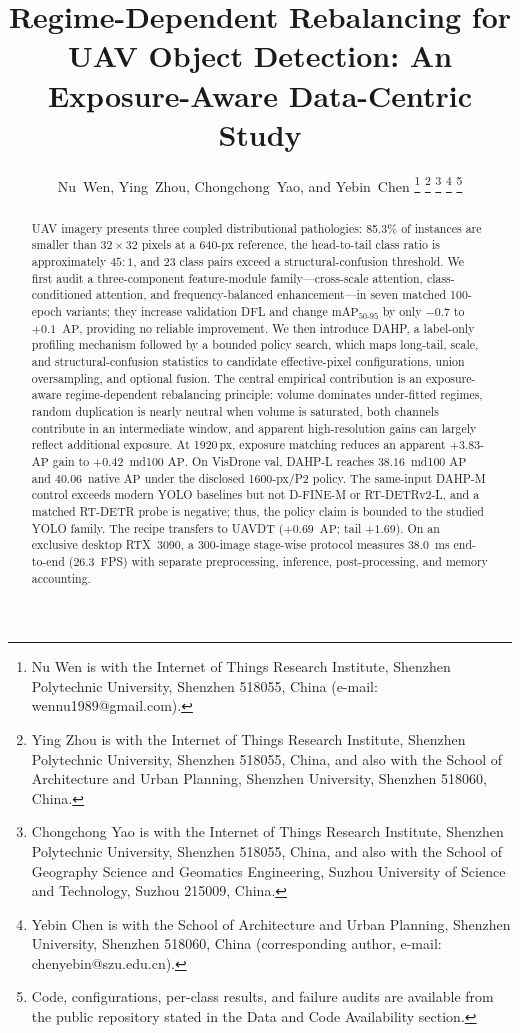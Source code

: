 \documentclass[journal]{IEEEtran}
\newcommand{\map}{\ensuremath{\mathrm{mAP}}}
\newcommand{\ap}{\ensuremath{\mathrm{AP}}}
\begin{document}
\title{Regime-Dependent Rebalancing for UAV Object Detection: An Exposure-Aware Data-Centric Study}

\author{Nu~Wen, Ying~Zhou, Chongchong~Yao, and Yebin~Chen%
\thanks{Nu Wen is with the Internet of Things Research Institute, Shenzhen Polytechnic University, Shenzhen 518055, China (e-mail: wennu1989@gmail.com).}%
\thanks{Ying Zhou is with the Internet of Things Research Institute, Shenzhen Polytechnic University, Shenzhen 518055, China, and also with the School of Architecture and Urban Planning, Shenzhen University, Shenzhen 518060, China.}%
\thanks{Chongchong Yao is with the Internet of Things Research Institute, Shenzhen Polytechnic University, Shenzhen 518055, China, and also with the School of Geography Science and Geomatics Engineering, Suzhou University of Science and Technology, Suzhou 215009, China.}%
\thanks{Yebin Chen is with the School of Architecture and Urban Planning, Shenzhen University, Shenzhen 518060, China (corresponding author, e-mail: chenyebin@szu.edu.cn).}%
\thanks{Code, configurations, per-class results, and failure audits are available from the public repository stated in the Data and Code Availability section.}}

\maketitle

\begin{abstract}
UAV imagery presents three coupled distributional pathologies: 85.3\% of instances are smaller than $32{\times}32$ pixels at a 640-px reference, the head-to-tail class ratio is approximately $45{:}1$, and 23 class pairs exceed a structural-confusion threshold. We first audit a three-component feature-module family---cross-scale attention, class-conditioned attention, and frequency-balanced enhancement---in seven matched 100-epoch variants; they increase validation DFL and change $\map_{50\text{-}95}$ by only $-0.7$ to $+0.1$~\ap, providing no reliable improvement. We then introduce DAHP, a label-only profiling mechanism followed by a bounded policy search, which maps long-tail, scale, and structural-confusion statistics to candidate effective-pixel configurations, union oversampling, and optional fusion. The central empirical contribution is an exposure-aware regime-dependent rebalancing principle: volume dominates under-fitted regimes, random duplication is nearly neutral when volume is saturated, both channels contribute in an intermediate window, and apparent high-resolution gains can largely reflect additional exposure. At 1920\,px, exposure matching reduces an apparent $+3.83$-\ap{} gain to $+0.42$~md100 \ap. On VisDrone val, DAHP-L reaches $38.16$~md100 \ap{} and $40.06$~native \ap{} under the disclosed 1600-px/P2 policy. The same-input DAHP-M control exceeds modern YOLO baselines but not D-FINE-M or RT-DETRv2-L, and a matched RT-DETR probe is negative; thus, the policy claim is bounded to the studied YOLO family. The recipe transfers to UAVDT ($+0.69$~\ap; tail $+1.69$). On an exclusive desktop RTX~3090, a 300-image stage-wise protocol measures $38.0$~ms end-to-end ($26.3$~FPS) with separate preprocessing, inference, post-processing, and memory accounting.
\end{abstract}
\end{document}
